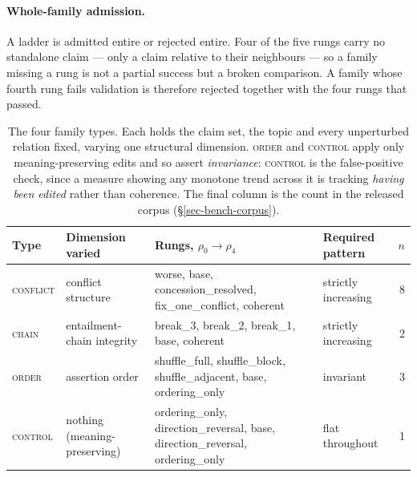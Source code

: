 \paragraph{Whole-family admission.} A ladder is admitted entire or rejected entire. Four of the five
rungs carry no standalone claim --- only a claim relative to their neighbours --- so a family missing a
rung is not a partial success but a broken comparison. A family whose fourth rung fails validation is
therefore rejected together with the four rungs that passed.

\begin{table}[tbp]
\centering\small
\caption{The four family types. Each holds the claim set, the topic and every unperturbed relation fixed,
  varying one structural dimension. \textsc{order} and \textsc{control} apply only meaning-preserving
  edits and so assert \emph{invariance}: \textsc{control} is the false-positive check, since a measure
  showing any monotone trend across it is tracking \emph{having been edited} rather than coherence. The
  final column is the count in the released corpus (\S\ref{sec-bench-corpus}).}
\label{tab:ladders}
\begin{tabular}{@{}lp{2.3cm}p{5.3cm}p{2.6cm}r@{}}
\toprule
Type & Dimension varied & Rungs, $\rho_0 \to \rho_4$ & Required pattern & $n$ \\
\midrule
\textsc{conflict} & conflict structure
  & \textsf{worse}, \textsf{base}, \textsf{concession\_resolved}, \textsf{fix\_one\_conflict},
    \textsf{coherent}
  & strictly increasing & 8 \\[3pt]
\textsc{chain} & entailment-chain integrity
  & \textsf{break\_3}, \textsf{break\_2}, \textsf{break\_1}, \textsf{base}, \textsf{coherent}
  & strictly increasing & 2 \\[3pt]
\textsc{order} & assertion order
  & \textsf{shuffle\_full}, \textsf{shuffle\_block}, \textsf{shuffle\_adjacent}, \textsf{base},
    \textsf{ordering\_only}
  & invariant & 3 \\[3pt]
\textsc{control} & nothing (meaning-preserving)
  & \textsf{ordering\_only}, \textsf{direction\_reversal}, \textsf{base},
    \textsf{direction\_reversal}, \textsf{ordering\_only}
  & flat throughout & 1 \\
\bottomrule
\end{tabular}
\end{table}

